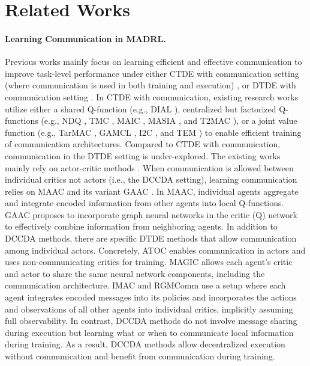 \section{Related Works}
\label{sec:relatedWorks}

\paragraph{\textnormal{\textbf{Learning Communication in MADRL}}.} Previous works mainly focus on learning efficient and effective communication to improve task-level performance under either CTDE with communication setting (where communication is used in both training and execution) \cite{Wang2020NDQ,Das2019TarMAC}, or DTDE with communication setting \cite{Iqbal2019MAAC,Liu2020G2ANet}. In CTDE with communication, existing research works utilize either a shared Q-function (e.g., DIAL \cite{Foerster2016Comm}), centralized but factorized Q-functions (e.g., NDQ \cite{Wang2020NDQ}, TMC \cite{Zhang2020TMC}, MAIC \cite{Yuan2022MAIC}, MASIA \cite{Guan2023Aggregation}, and T2MAC \cite{Sun2024T2MAC}), or a joint value function (e.g., TarMAC \cite{Das2019TarMAC}, GAMCL \cite{Mao2020GatedACML}, I2C \cite{Ding2020I2C}, and TEM \cite{Guo2023Email}) to enable efficient training of communication architectures. Compared to CTDE with communication, communication in the DTDE setting is under-explored. The existing works mainly rely on actor-critic methods \cite{Jiang2018ATOC,Liu2020G2ANet,Niu2021MAGIC,Chen2024RGMComm}. When communication is allowed between individual critics not actors (i.e., the DCCDA setting), learning communication relies on MAAC \cite{Iqbal2019MAAC} and its variant GAAC \cite{Liu2020G2ANet}. In MAAC, individual agents aggregate and integrate encoded information from other agents into local Q-functions. GAAC proposes to incorporate graph neural networks in the critic (Q) network to effectively combine information from neighboring agents. In addition to DCCDA methods, there are specific DTDE methods that allow communication among individual actors. Concretely, ATOC \cite{Jiang2018ATOC} enables communication in actors and uses non-communicating critics for training. MAGIC \cite{Niu2021MAGIC} allows each agent's critic and actor to share the same neural network components, including the communication architecture. IMAC \cite{Wang2020IMAC} and RGMComm \cite{Chen2024RGMComm} use a setup where each agent integrates encoded messages into its policies and incorporates the actions and observations of all other agents into individual critics, implicitly assuming full observability. In contrast, DCCDA methods do not involve message sharing during execution but learning what or when to communicate local information during training. As a result, DCCDA methods allow decentralized execution without communication and benefit from communication during training.

